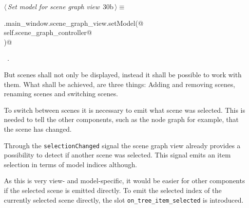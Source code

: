 \documentclass[
    a4paper,      %
    10pt,         %
    openright,    %
    notitlepage,  %
    parskip=half, %
]{scrreprt}       %
\theoremstyle{definition}                    %
\begin{document}
\begin{flushleft} \small
\begin{minipage}{\linewidth}\label{scrap33}\raggedright\small
{} $\langle\,${\itshape Set model for scene graph view}\nobreak\ {\footnotesize {30b}}$\,\rangle\equiv$
\vspace{-1exm}
\begin{list}{}{} \item
\mbox{}\lstinline@self.main_window.scene_graph_view.setModel(@\\
\mbox{}\lstinline@    self.scene_graph_controller@\\
\mbox{}\lstinline@)@{\NWsep}
\end{list}
\vspace{-1.5ex}
\footnotesize
\begin{list}{}{\setlength{\itemsep}{-\parsep}\setlength{\itemindent}{-\leftmargin}}
\item \NWtxtMacroRefIn\ .

\item{}
\end{list}
\end{minipage}\vspace{4ex}
\end{flushleft}
But scenes shall not only be displayed, instead it shall be possible to work
with them. What shall be achieved, are three things: Adding and removing scenes,
renaming scenes and switching scenes.

To switch between scenes it is necessary to emit what scene was selected. This
is needed to tell the other components, such as the node graph for example, that
the scene has changed.

Through the \verb+selectionChanged+ signal the scene graph view already provides
a possibility to detect if another scene was selected. This signal emits an item
selection in terms of model indices although.

As this is very view- and model-specific, it would be easier for other
components if the selected scene is emitted directly. To emit the selected
index of the currently selected scene directly, the slot
\verb+on_tree_item_selected+ is introduced.
\end{document}
